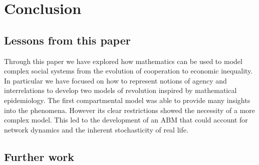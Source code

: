 \chapter{Conclusion}\label{ch:conclusion}
\section{Lessons from this paper}
Through this paper we have explored how mathematics can be used to model complex social systems from the evolution of cooperation to economic inequality. In particular we have focused on how to represent notions of agency and interrelations to develop two models of revolution inspired by mathematical epidemiology. The first compartmental model was able to provide many insights into the phenomena. However its clear restrictions showed the necessity of a more complex model. This led to the development of an ABM that could account for network dynamics and the inherent stochasticity of real life.

\section{Further work}
